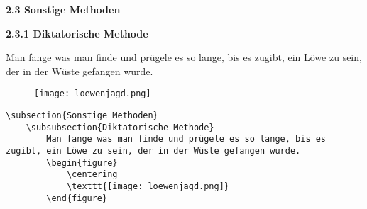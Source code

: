 \begin{frame}[fragile]
	\Losung
	\begin{outputbox}
		{\Large \textbf{2.3 Sonstige Methoden}}
		
		{\large \textbf{2.3.1  Diktatorische Methode}}
		
		Man fange was man finde und prügele es so lange, bis es zugibt, ein Löwe zu sein, der in der Wüste gefangen wurde.
		\vspace{-0.2cm}
		\begin{figure}[H]
			\centering
			\texttt{[image: loewenjagd.png]}
		\end{figure}
		\vspace{-0.2cm}
	\end{outputbox}
	
	\Code
	\begin{lstlisting}
\subsection{Sonstige Methoden}
	\subsubsection{Diktatorische Methode}
		Man fange was man finde und prügele es so lange, bis es zugibt, ein Löwe zu sein, der in der Wüste gefangen wurde.
		\begin{figure}
			\centering
			\texttt{[image: loewenjagd.png]}
		\end{figure}
	\end{lstlisting}
\end{frame}
